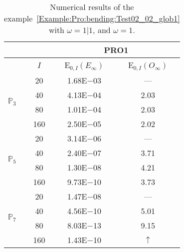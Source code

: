 \begin{table}[H]
\caption{Numerical results of the example~\ref{Example:Pro:bending:Test02_02_glob1} with $\omega=1|1$, and $\omega=1$.}
\setlength{\tabcolsep}{5pt}
\centering
\begin{tabular}{@{}l c c c@{}}
\toprule
 &  & \multicolumn{2}{c}{PRO1}\\
\midrule
 & $I$ & E$_{0,I}(E_{\infty})$ & E$_{0,I}(O_{\infty})$\\
\midrule
\multirow{4}{*}{$\mathbb{P}_{3}$} & 20 & 1.68E$-$03 & ---\\
 & 40 & 4.13E$-$04 & 2.03\\
 & 80 & 1.01E$-$04 & 2.03\\
 & 160 & 2.50E$-$05 & 2.02\\
\midrule
\multirow{4}{*}{$\mathbb{P}_{5}$} & 20 & 3.14E$-$06 & ---\\
 & 40 & 2.40E$-$07 & 3.71\\
 & 80 & 1.30E$-$08 & 4.21\\
 & 160 & 9.73E$-$10 & 3.73\\
\midrule
\multirow{4}{*}{$\mathbb{P}_{7}$} & 20 & 1.47E$-$08 & ---\\
 & 40 & 4.56E$-$10 & 5.01\\
 & 80 & 8.03E$-$13 & 9.15\\
 & 160 & 1.43E$-$10 & $\uparrow$\\
\bottomrule
\end{tabular}
\label{Table:PRO:test_02_02_test13}
\end{table}
